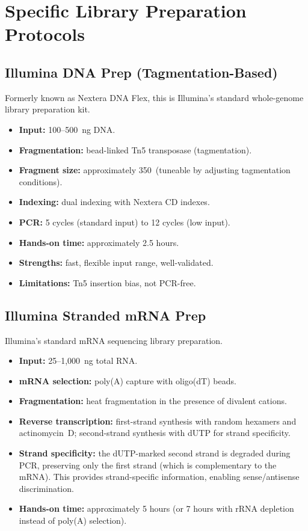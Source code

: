 \section{Specific Library Preparation Protocols}
\label{sec:specific_protocols}

\subsection{Illumina DNA Prep (Tagmentation-Based)}

Formerly known as Nextera DNA Flex, this is Illumina's standard whole-genome library preparation kit.

\begin{itemize}[nosep]
  \item \textbf{Input:} 100--500~ng DNA.
  \item \textbf{Fragmentation:} bead-linked Tn5 transposase (tagmentation).
  \item \textbf{Fragment size:} approximately 350\basepair\ (tuneable by adjusting tagmentation conditions).
  \item \textbf{Indexing:} dual indexing with Nextera CD indexes.
  \item \textbf{PCR:} 5 cycles (standard input) to 12 cycles (low input).
  \item \textbf{Hands-on time:} approximately 2.5 hours.
  \item \textbf{Strengths:} fast, flexible input range, well-validated.
  \item \textbf{Limitations:} Tn5 insertion bias, not PCR-free.
\end{itemize}

\subsection{Illumina Stranded mRNA Prep}

Illumina's standard mRNA sequencing library preparation.

\begin{itemize}[nosep]
  \item \textbf{Input:} 25--1{,}000~ng total RNA.
  \item \textbf{mRNA selection:} poly(A) capture with oligo(dT) beads.
  \item \textbf{Fragmentation:} heat fragmentation in the presence of divalent cations.
  \item \textbf{Reverse transcription:} first-strand synthesis with random hexamers and actinomycin~D; second-strand synthesis with dUTP for strand specificity.
  \item \textbf{Strand specificity:} the dUTP-marked second strand is degraded during PCR, preserving only the first strand (which is complementary to the mRNA). This provides strand-specific information, enabling sense/antisense discrimination.
  \item \textbf{Hands-on time:} approximately 5 hours (or 7 hours with rRNA depletion instead of poly(A) selection).
\end{itemize}

